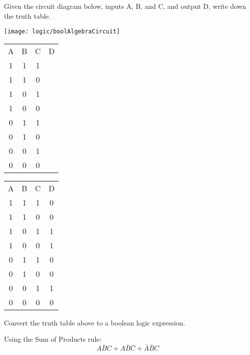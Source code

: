 \begin{blocksection}
\question


Given the circuit diagram below, inputs A, B, and C, and output D, write down the truth table.

\texttt{[image: logic/boolAlgebraCircuit]}

\begin{tabular}{c c c c}
A		&B		&C 		&D \\
1		&1		&1		& \\
1		&1		&0		& \\
1		&0		&1		& \\
1		&0		&0		& \\
0		&1		&1		& \\
0		&1		&0		& \\
0		&0		&1		& \\
0		&0		&0		& \\
\end{tabular}

\begin{solution}
\begin{tabular}{c c c c}
A		&B		&C 		&D \\
1		&1		&1		&0 \\
1		&1		&0		&0 \\
1		&0		&1		&1 \\
1		&0		&0		&1 \\
0		&1		&1		&0 \\
0		&1		&0		&0 \\
0		&0		&1		&1 \\
0		&0		&0		&0 \\
\end{tabular}
\end{solution}

\end{blocksection}
\begin{blocksection}

\question

Convert the truth table above to a boolean logic expression.

\begin{solution}[0.2in]
Using the Sum of Products rule:
$$A\bar{B}C + A\bar{B}\bar{C} + \bar{A}\bar{B}C$$
\end{solution}

\end{blocksection}
